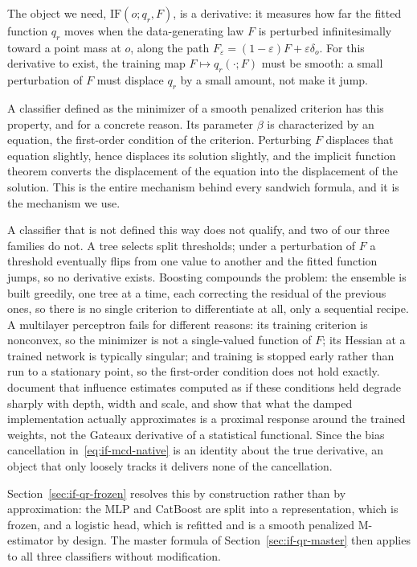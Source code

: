 \documentclass[11pt]{article}
\newcommand{\IF}{\mathrm{IF}}
\begin{document}
The object we need, $\IF(o;q_r,F)$, is a derivative: it measures how far the fitted
function $q_r$ moves when the data-generating law $F$ is perturbed infinitesimally
toward a point mass at $o$, along the path $F_\varepsilon=(1-\varepsilon)F+\varepsilon\delta_o$.
For this derivative to exist, the training map $F\mapsto q_r(\cdot;F)$ must be smooth:
a small perturbation of $F$ must displace $q_r$ by a small amount, not make it jump.

A classifier defined as the minimizer of a smooth penalized criterion has this
property, and for a concrete reason. Its parameter $\beta$ is characterized by an
equation, the first-order condition of the criterion. Perturbing $F$ displaces that
equation slightly, hence displaces its solution slightly, and the implicit function
theorem converts the displacement of the equation into the displacement of the
solution. This is the entire mechanism behind every sandwich formula, and it is the
mechanism we use.

A classifier that is not defined this way does not qualify, and two of our three
families do not. A tree selects split thresholds; under a perturbation of $F$ a
threshold eventually flips from one value to another and the fitted function jumps,
so no derivative exists. Boosting compounds the problem: the ensemble is built
greedily, one tree at a time, each correcting the residual of the previous ones, so
there is no single criterion to differentiate at all, only a sequential recipe. A
multilayer perceptron fails for different reasons: its training criterion is
nonconvex, so the minimizer is not a single-valued function of $F$; its Hessian at a
trained network is typically singular; and training is stopped early rather than run
to a stationary point, so the first-order condition does not hold exactly.
\citet{basu2021} document that influence estimates computed as if these conditions
held degrade sharply with depth, width and scale, and \citet{bae2022} show that what
the damped implementation actually approximates is a proximal response around the
trained weights, not the Gateaux derivative of a statistical functional. Since the
bias cancellation in~\eqref{eq:if-mcd-native} is an identity about the true
derivative, an object that only loosely tracks it delivers none of the cancellation.

Section~\ref{sec:if-qr-frozen} resolves this by construction rather than by
approximation: the MLP and CatBoost are split into a representation, which is frozen,
and a logistic head, which is refitted and is a smooth penalized M-estimator by
design. The master formula of Section~\ref{sec:if-qr-master} then applies to all three
classifiers without modification.
\end{document}
